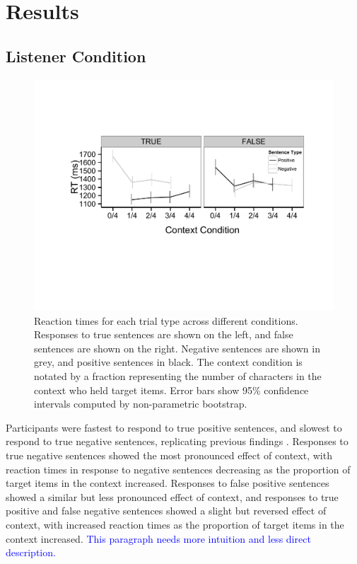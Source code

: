 \documentclass[man, noapacite]{apa2}
\newcommand{\blue}[1]{\textcolor{blue}{#1}}
\begin{document}

\section{Results}

\subsection{Listener Condition}

\begin{figure}[t]
\begin{center} 
\includegraphics[width=4.5in]{figures/rts.pdf}
\caption{\label{fig:e2line} Reaction times for each trial type across different conditions. Responses to true sentences are shown on the left, and false sentences are shown on the right.  Negative sentences are shown in grey, and positive sentences in black.  The context condition is notated by a fraction representing the number of characters in the context who held target items. Error bars show 95\% confidence intervals computed by non-parametric bootstrap.}
\end{center} 
\end{figure}

Participants were fastest to respond to true positive sentences, and slowest to respond to true negative sentences, replicating previous findings \cite{hclark1972}.  Responses to true negative sentences showed the most pronounced effect of context, with reaction times in response to negative sentences decreasing as the proportion of target items in the context increased.  Responses to false positive sentences showed a similar but less pronounced effect of context, and responses to true positive and false negative sentences showed a slight but reversed effect of context, with increased reaction times as the proportion of target items in the context increased. \blue{This paragraph needs more intuition and less direct description.}
\end{document}
